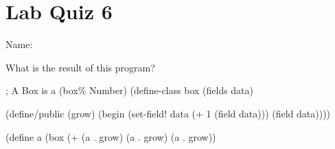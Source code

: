 \documentclass{article}
\begin{document}
\section*{Lab Quiz 6}

\bigskip
\bigskip
Name: \underline{\hspace*{4in}}

\bigskip
\setlength{\parskip}{8pt}

What is the result of this program?

\bigskip

\begin{schemedisplay}
  ; A Box is a (box\% Number)
  (define-class box%
    (fields data)

    (define/public (grow)
      (begin
        (set-field! data (+ 1 (field data)))
        (field data))))

  (define a (box%
  (+ (a . grow) (a . grow) (a . grow))
\end{schemedisplay}
\end{document}
